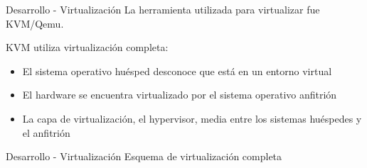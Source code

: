 \begin{frame}{Desarrollo - Virtualización}
    \vspace{-1.5cm}
    La herramienta utilizada para virtualizar fue KVM/Qemu.

    KVM utiliza virtualización completa:
    \begin{itemize}
        \item El sistema operativo huésped desconoce que está en un entorno virtual
        \item El hardware se encuentra virtualizado por el sistema operativo anfitrión
        \item La capa de virtualización, el hypervisor, media entre los sistemas huéspedes y el anfitrión
    \end{itemize}

\end{frame}

\begin{frame}{Desarrollo - Virtualización}
    \vspace{0cm} {Esquema de virtualización completa}
    \vspace{0.5cm}
    \begin{figure}[ht]
       \centering
       \vspace{-0.50cm}
    \end{figure}

\end{frame}

